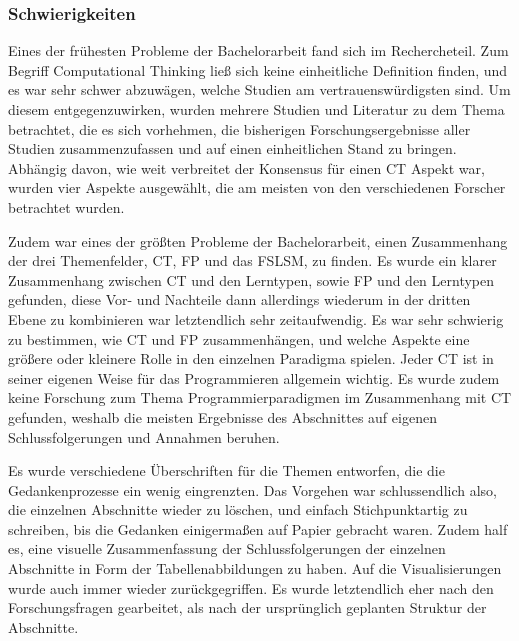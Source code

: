 \subsubsection{Schwierigkeiten}
Eines der frühesten Probleme der Bachelorarbeit fand sich im Rechercheteil. Zum Begriff Computational Thinking ließ sich keine einheitliche Definition finden, und es war sehr schwer abzuwägen, welche Studien am vertrauenswürdigsten sind.
Um diesem entgegenzuwirken, wurden mehrere Studien und Literatur zu dem Thema betrachtet, die es sich vorhehmen, die bisherigen Forschungsergebnisse aller Studien zusammenzufassen und auf einen einheitlichen Stand zu bringen. Abhängig davon, wie weit verbreitet der Konsensus für einen CT Aspekt war, wurden vier Aspekte ausgewählt, die am meisten von den verschiedenen Forscher betrachtet wurden.

Zudem war eines der größten Probleme der Bachelorarbeit, einen Zusammenhang der drei Themenfelder, CT, FP und das FSLSM, zu finden. Es wurde ein klarer Zusammenhang zwischen CT und den Lerntypen, sowie FP und den Lerntypen gefunden, diese Vor- und Nachteile dann allerdings wiederum in der dritten Ebene zu kombinieren war letztendlich sehr zeitaufwendig.
Es war sehr schwierig zu bestimmen, wie CT und FP zusammenhängen, und welche Aspekte eine größere oder kleinere Rolle in den einzelnen Paradigma spielen. Jeder CT ist in seiner eigenen Weise für das Programmieren allgemein wichtig.
Es wurde zudem keine Forschung zum Thema Programmierparadigmen im Zusammenhang mit CT gefunden, weshalb die meisten Ergebnisse des Abschnittes auf eigenen Schlussfolgerungen und Annahmen beruhen.

Es wurde verschiedene Überschriften für die Themen entworfen, die die Gedankenprozesse ein wenig eingrenzten. Das Vorgehen war schlussendlich also, die einzelnen Abschnitte wieder zu löschen, und einfach Stichpunktartig zu schreiben, bis die Gedanken einigermaßen auf Papier gebracht waren. Zudem half es, eine visuelle Zusammenfassung der Schlussfolgerungen der einzelnen Abschnitte in Form der Tabellenabbildungen zu haben. Auf die Visualisierungen wurde auch immer wieder zurückgegriffen. Es wurde letztendlich eher nach den Forschungsfragen gearbeitet, als nach der ursprünglich geplanten Struktur der Abschnitte.

